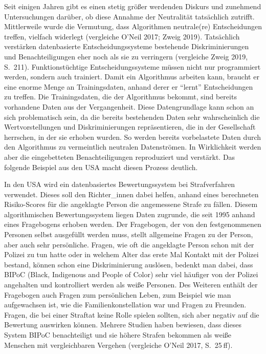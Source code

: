 \documentclass[a4paper,
fontsize=11pt,
oneside,
numbers=noperiodatend,
parskip=half-,
bibliography=totoc,
final
]{scrartcl}
\begin{document}
Seit einigen Jahren gibt es einen stetig größer werdenden Diskurs und
zunehmend Untersuchungen darüber, ob diese Annahme der Neutralität
tatsächlich zutrifft. Mittlerweile wurde die Vermutung, dass Algorithmen
neutrale(re) Entscheidungen treffen, vielfach widerlegt (vergleiche O'Neil
2017; Zweig 2019). Tatsächlich verstärken datenbasierte
Entscheidungssysteme bestehende Diskriminierungen und Benachteiligungen
eher noch als sie zu verringern (vergleiche Zweig 2019, S.~211).
Funktionstüchtige Entscheidungssysteme müssen nicht nur programmiert
werden, sondern auch trainiert. Damit ein Algorithmus arbeiten kann,
braucht er eine enorme Menge an Trainingsdaten, anhand derer er
\enquote{lernt} Entscheidungen zu treffen. Die Trainingsdaten, die der
Algorithmus bekommt, sind bereits vorhandene Daten aus der
Vergangenheit. Diese Datengrundlage kann schon an sich problematisch
sein, da die bereits bestehenden Daten sehr wahrscheinlich die
Wertvorstellungen und Diskriminierungen repräsentieren, die in der
Gesellschaft herrschen, in der sie erhoben wurden. So werden bereits
vorbelastete Daten durch den Algorithmus zu vermeintlich neutralen
Datenströmen. In Wirklichkeit werden aber die eingebetteten
Benachteiligungen reproduziert und verstärkt. Das folgende Beispiel aus
den USA macht diesen Prozess deutlich.

In den USA wird ein datenbasiertes Bewertungssystem bei Strafverfahren
verwendet. Dieses soll den Richter\_innen dabei helfen, anhand eines
berechneten Risiko-Scores für die angeklagte Person die angemessene
Strafe zu fällen. Diesem algorithmischen Bewertungssystem liegen Daten
zugrunde, die seit 1995 anhand eines Fragebogens erhoben werden. Der
Fragebogen, der von den festgenommenen Personen selbst ausgefüllt werden
muss, stellt allgemeine Fragen zu der Person, aber auch sehr
persönliche. Fragen, wie oft die angeklagte Person schon mit der Polizei
zu tun hatte oder in welchem Alter das erste Mal Kontakt mit der Polizei
bestand, können schon eine Diskriminierung auslösen, bedenkt man dabei,
dass BIPoC (Black, Indigenous and People of Color) sehr viel häufiger
von der Polizei angehalten und kontrolliert werden als weiße Personen.
Des Weiteren enthält der Fragebogen auch Fragen zum persönlichen Leben,
zum Beispiel wie man aufgewachsen ist, wie die Familienkonstellation war
und Fragen zu Freunden. Fragen, die bei einer Straftat keine Rolle
spielen sollten, sich aber negativ auf die Bewertung auswirken können.
Mehrere Studien haben bewiesen, dass dieses System BIPoC benachteiligt
und sie höhere Strafen bekommen als weiße Menschen mit vergleichbaren
Vergehen (vergleiche O'Neil 2017, S.~25 ff).
\end{document}
